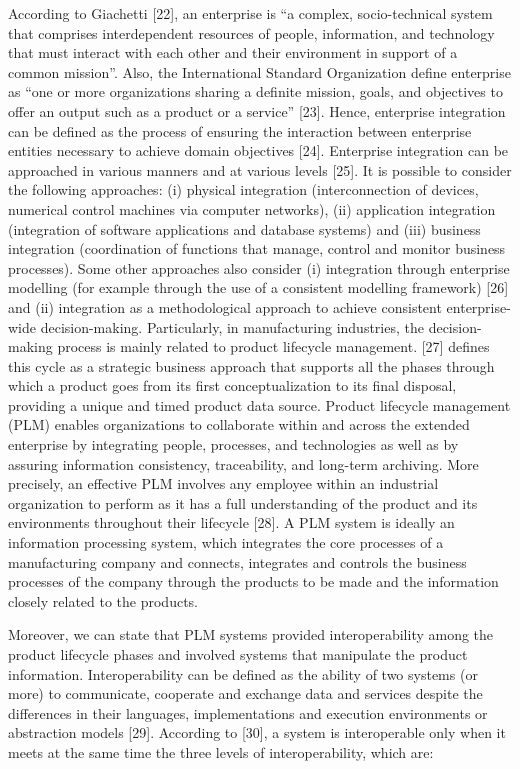 \documentclass[peerreview]{IEEEtran}
\begin{document}
According to Giachetti \cite{}[22], an enterprise is “a complex, socio-technical system that comprises interdependent resources of people, information, and technology that must interact with each other and their environment in support of a common mission”. Also, the International Standard Organization define enterprise as “one or more organizations sharing a definite mission, goals, and objectives to offer an output such as a product or a service” \cite{}[23]. Hence, enterprise integration can be defined as the process of ensuring the interaction between enterprise entities necessary to achieve domain objectives \cite{}[24]. Enterprise integration can be approached in various manners and at various levels \cite{}[25]. It is possible to consider the following approaches: (i) physical integration (interconnection of devices, numerical control machines via computer networks), (ii) application integration (integration of software applications and database systems) and (iii) business integration (coordination of functions that manage, control and monitor business processes). Some other approaches also consider (i) integration through enterprise modelling (for example through the use of a consistent modelling framework) \cite{}[26] and (ii) integration as a methodological approach to achieve consistent enterprise-wide decision-making. Particularly, in manufacturing industries, the decision-making process is mainly related to product lifecycle management. \cite{}[27] defines this cycle as a strategic business approach that supports all the phases through which a product goes from its first conceptualization to its final disposal, providing a unique and timed product data source. Product lifecycle management (PLM) enables organizations to collaborate within and across the extended enterprise by integrating people, processes, and technologies as well as by assuring information consistency, traceability, and long-term archiving. More precisely, an effective PLM involves any employee within an industrial organization to perform as it has a full understanding of the product and its environments throughout their lifecycle \cite{}[28]. A PLM system is ideally an information processing system, which integrates the core processes of a manufacturing company and connects, integrates and controls the business processes of the company through the products to be made and the information closely related to the products.


Moreover, we can state that PLM systems provided interoperability among the product lifecycle phases and involved systems that manipulate the product information. Interoperability can be defined as the ability of two systems (or more) to communicate, cooperate and exchange data and services despite the differences in their languages, implementations and execution environments or abstraction models \cite{}[29]. 
According to \cite{}[30], a system is interoperable only when it meets at the same time the three levels of interoperability, which are: 
\end{document}
